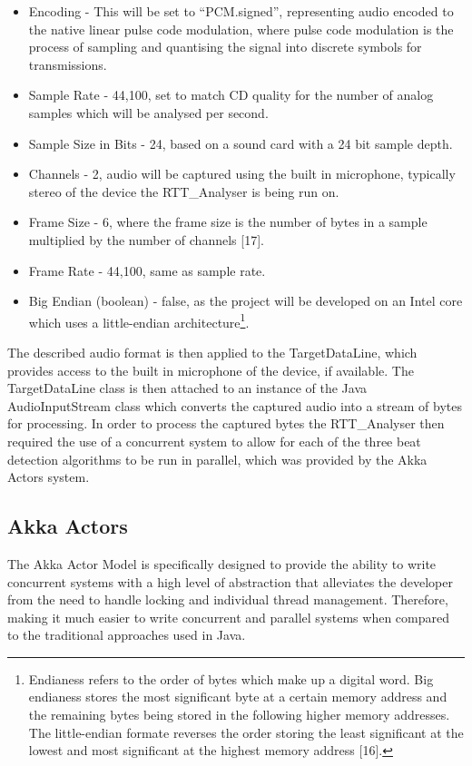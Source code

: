 \documentclass[a4paper, 11pt]{article}
\begin{document}
\begin{itemize}
\item Encoding - This will be set to ``PCM.signed'', representing audio encoded to the native linear pulse code modulation, where pulse code modulation is the process of sampling and quantising the signal into discrete symbols for transmissions\cite{pulseWag}.
\item Sample Rate - 44,100, set to match CD quality for the number of analog samples which will be analysed per second. 
\item Sample Size in Bits - 24, based on a sound card with a 24 bit sample depth.
\item Channels - 2, audio will be captured using the built in microphone, typically stereo of the device the RTT\_Analyser is being run on.
\item Frame Size - 6, where the frame size is the number of bytes in a sample multiplied by the number of channels [17].
\item Frame Rate - 44,100, same as sample rate.
\item Big Endian (boolean) - false, as the project will be developed on an Intel core which uses a little-endian architecture\footnote{Endianess refers to the order of bytes which make up a digital word. Big endianess stores the most significant byte at a certain memory address and the remaining bytes being stored in the following higher memory addresses. The little-endian formate reverses the order storing the least significant at the lowest and most significant at the highest memory address [16].}.
\end{itemize}

The described audio format is then applied to the TargetDataLine, which provides access to the built in microphone of the device, if available. The TargetDataLine class is then attached to an instance of the Java AudioInputStream class which converts the captured audio into a stream of bytes for processing\cite{soundTrail}. In order to process the captured bytes the RTT\_Analyser then required the use of a concurrent system to allow for each of the three beat detection algorithms to be run in parallel, which was provided by the Akka Actors system.

\subsection{Akka Actors}
The Akka Actor Model is specifically designed to provide the ability to write concurrent systems with a high level of abstraction that alleviates the developer from the need to handle locking and individual thread management. Therefore, making it much easier to write concurrent and parallel systems when compared to the traditional approaches used in Java\cite{akkaActors}.
\end{document}
